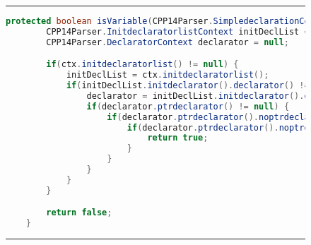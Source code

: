 \begin{figure}[H]
\noindent\rule{\textwidth}{1pt}
\begin{lstlisting}[language=Java, caption={If block example}, label={lst:ifBlockExample}]
	protected boolean isVariable(CPP14Parser.SimpledeclarationContext ctx){
		CPP14Parser.InitdeclaratorlistContext initDeclList = null;
		CPP14Parser.DeclaratorContext declarator = null;

		if(ctx.initdeclaratorlist() != null) {
			initDeclList = ctx.initdeclaratorlist();
			if(initDeclList.initdeclarator().declarator() != null) {
				declarator = initDeclList.initdeclarator().declarator();
				if(declarator.ptrdeclarator() != null) {
					if(declarator.ptrdeclarator().noptrdeclarator() != null) {
			            if(declarator.ptrdeclarator().noptrdeclarator().declaratorid() != null) {
							return true;
						}
					}
				}
			}
		}

		return false;
	}
\end{lstlisting}
\noindent\rule{\textwidth}{1pt}
\end{figure}